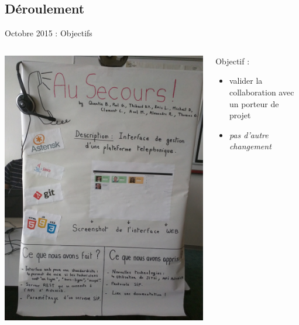 \documentclass{beamer}
\begin{document}
\subsection{Déroulement}
\begin{frame}{Octobre 2015 : Objectifs}
  \begin{columns}
    \begin{column}{0.5\textwidth}
      \begin{center}
        \includegraphics[width=\textwidth]{includes/201510_salon.jpg}      
      \end{center}
    \end{column}
    \begin{column}{0.5\textwidth}
      Objectif :
      \begin{itemize}
        \item valider la collaboration avec un porteur de projet
        \item \textit{pas d'autre changement}
      \end{itemize}
    \end{column}
  \end{columns}
\end{frame}
\end{document}
